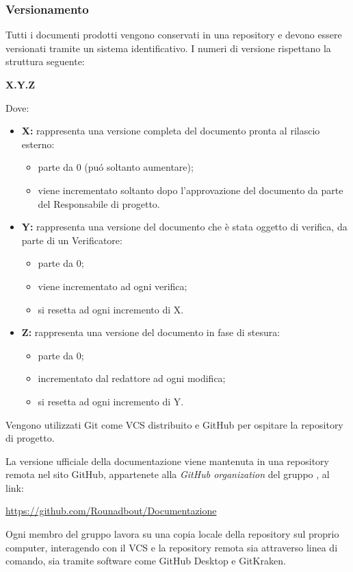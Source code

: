     \subsubsection{Versionamento}
        Tutti i documenti prodotti vengono conservati in una repository e devono essere versionati tramite un sistema identificativo. I numeri di versione rispettano la struttura seguente:
        \begin{center}
          \textbf{X.Y.Z}
        \end{center}
        Dove:
        \begin{itemize}
          \item \textbf{X:} rappresenta una versione completa del documento pronta al rilascio esterno:
            \begin{itemize}
              \item parte da 0 (puó soltanto aumentare);
              \item viene incrementato soltanto dopo l'approvazione del documento da parte del Responsabile di progetto.
            \end{itemize}
          \item \textbf{Y:} rappresenta una versione del documento che è stata oggetto di verifica, da parte di un Verificatore:
            \begin{itemize}
              \item parte da 0;
              \item viene incrementato ad ogni verifica;
              \item si resetta ad ogni incremento di X.
            \end{itemize}
          \item \textbf{Z:} rappresenta una versione del documento in fase di stesura:
            \begin{itemize}
              \item parte da 0;
              \item incrementato dal redattore ad ogni modifica;
              \item si resetta ad ogni incremento di Y.
            \end{itemize}
        \end{itemize}

        Vengono utilizzati Git come VCS distribuito e GitHub per ospitare la repository di progetto.

        La versione ufficiale della documentazione viene mantenuta in una repository remota nel sito GitHub, appartenete alla \textit{GitHub organization} del gruppo \Gruppo{}, al link:
        \begin{center}
          \url{https://github.com/Rounadbout/Documentazione}
        \end{center}
        Ogni membro del gruppo lavora su una copia locale della repository sul proprio computer, interagendo con il VCS e la repository remota sia attraverso linea di comando, sia tramite software come GitHub Desktop e GitKraken.

